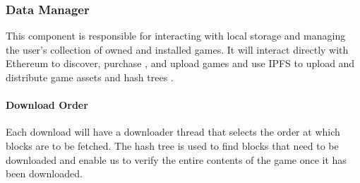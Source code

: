 \subsubsection{Data Manager}\label{subsubsec:data-manager}

This component is responsible for interacting with local storage and managing the user's collection of owned and installed games.
It will interact directly with Ethereum to discover, purchase , and upload   games and use IPFS to upload and distribute game assets  and hash trees .

\paragraph*{Download Order} Each download will have a downloader thread that selects the order at which blocks are to be fetched. The hash tree is used to find blocks that need to be downloaded and enable us to verify the entire contents of the game once it has been downloaded.

